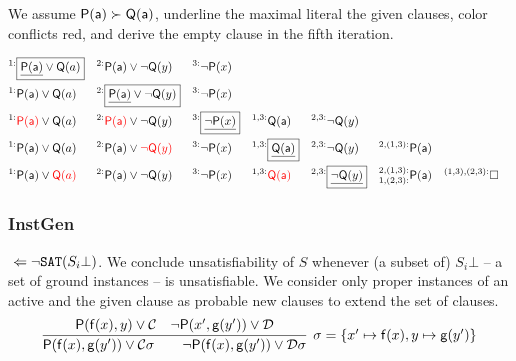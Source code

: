 \begin{example} We assume ${\mathsf P}({\mathsf a})\succ{\mathsf Q}({\mathsf a})$,
	underline the maximal literal the given clauses,
	color conflicts red,
	 and derive the empty clause in the fifth iteration.
	
	\begin{align*}
	^{1:}&\boxed{\underline{\mP(\ma)}\lor\mQ(a)} 
	& ^{2:}&\mP(\ma)\lor\lnot\mQ(y) & ^{3:}&\lnot\mP(x) 
	\\
	^{1:}&\mP(\ma)\lor\mQ(a) 
	& ^{2:}&\boxed{\underline{\mP(\ma)}\lor\lnot\mQ(y)} & ^{3:}&\lnot\mP(x) 
	\\
	^{1:}&{\colLo\mP(\ma)}\lor\mQ(a) 
	& ^{2:}&{\colLo\mP(\ma)}\lor\lnot\mQ(y) 
	& ^{3:}&\boxed{\underline{\lnot\mP(x)}} 
	& ^{1,3:}&\mQ(\ma) 
	& ^{2,3:}&\lnot\mQ(y)
	\\
	^{1:}&\mP(\ma)\lor\mQ(a) 
	& ^{2:}&\mP(\ma)\lor{\colLo\lnot\mQ(y)} 
	& ^{3:}&\lnot\mP(x)
	& ^{1,3:}&\boxed{\underline{\mQ(\ma)}} 
	& ^{2,3:}&\lnot\mQ(y) 
	& ^{2,(1,3):}&\mP(\ma)
	\\
	^{1:}&\mP(\ma)\lor{\colLo\mQ(a)} 
	& ^{2:}&\mP(\ma)\lor\lnot\mQ(y) 
	& ^{3:}&\lnot\mP(x)
	& ^{1,3:}&\colLo\mQ(\ma) 
	& ^{2,3:}&\boxed{\underline{\lnot\mQ(y)}} 
	& ^{2,(1,3):}_{1,(2,3):}&\mP(\ma)
	& ^{(1,3),(2,3):}&\emptyclause
	\\
	\end{align*}
\end{example}

\subsubsection{InstGen}

\jek$\ \Leftarrow \lnot\texttt{SAT}(S_i\bot)$. We conclude unsatisfiability of $S$ whenever (a subset of) $S_i\bot$ -- a set of ground instances -- is unsatisfiable. 
We consider only proper instances of an active and the given clause as probable new clauses to extend the set of clauses.
\begin{gather*}
	\infer[\sigma=\{ x'\mapsto\mf(x), y\mapsto\mg(y') \}]{
		\mP(\mf(x),\mg(y')) \lor\mcC\sigma 
		\qquad 
		\lnot\mP(\mf(x),\mg(y'))\lor\mcD\sigma
	}{
		\mP(\mf(x), y) \lor \mcC & \lnot\mP(x',\mg(y')) \lor \mcD
	}
\end{gather*}


